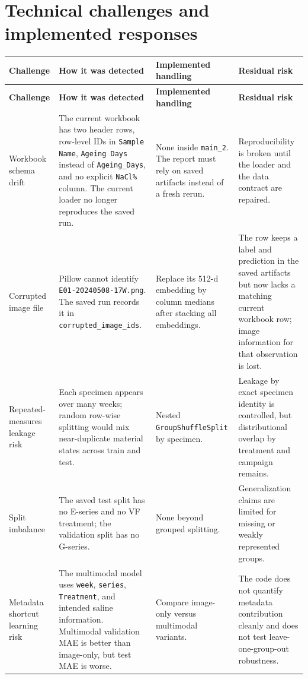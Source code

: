 \documentclass[11pt]{article}
\begin{document}
\section{Technical challenges and implemented responses}

\begin{longtable}{p{} p{} p{} p{}}
\toprule
\textbf{Challenge} & \textbf{How it was detected} & \textbf{Implemented handling} & \textbf{Residual risk} \\
\midrule
\endfirsthead
\toprule
\textbf{Challenge} & \textbf{How it was detected} & \textbf{Implemented handling} & \textbf{Residual risk} \\
\midrule
\endhead
Workbook schema drift & The current workbook has two header rows, row-level IDs in \texttt{Sample Name}, \texttt{Ageing Days} instead of \texttt{Ageing\_Days}, and no explicit \texttt{NaCl\%} column. The current loader no longer reproduces the saved run. & None inside \texttt{main\_2}. The report must rely on saved artifacts instead of a fresh rerun. & Reproducibility is broken until the loader and the data contract are repaired. \\
Corrupted image file & Pillow cannot identify \texttt{E01-20240508-17W.png}. The saved run records it in \texttt{corrupted\_image\_ids}. & Replace its 512-d embedding by column medians after stacking all embeddings. & The row keeps a label and prediction in the saved artifacts but now lacks a matching current workbook row; image information for that observation is lost. \\
Repeated-measures leakage risk & Each specimen appears over many weeks; random row-wise splitting would mix near-duplicate material states across train and test. & Nested \texttt{GroupShuffleSplit} by specimen. & Leakage by exact specimen identity is controlled, but distributional overlap by treatment and campaign remains. \\
Split imbalance & The saved test split has no E-series and no VF treatment; the validation split has no G-series. & None beyond grouped splitting. & Generalization claims are limited for missing or weakly represented groups. \\
Metadata shortcut learning risk & The multimodal model uses \texttt{week}, \texttt{series}, \texttt{Treatment}, and intended saline information. Multimodal validation MAE is better than image-only, but test MAE is worse. & Compare image-only versus multimodal variants. & The code does not quantify metadata contribution cleanly and does not test leave-one-group-out robustness. \\

\end{longtable}
\end{document}

